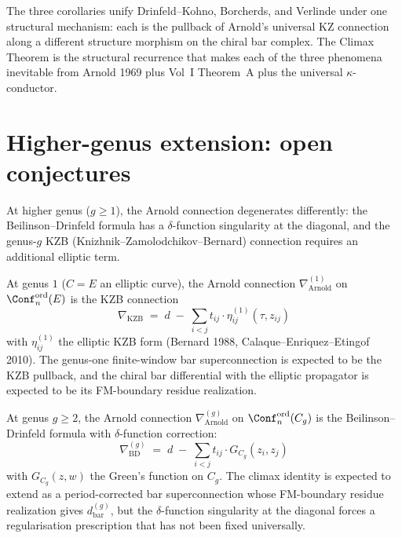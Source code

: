 The three corollaries unify Drinfeld--Kohno, Borcherds, and Verlinde
under one structural mechanism: each is the pullback of Arnold's universal
KZ connection along a different structure morphism on the chiral bar
complex. The Climax Theorem is the structural recurrence that makes
each of the three phenomena inevitable from Arnold 1969 plus Vol~I
Theorem~A plus the universal $\kappa$-conductor.

\section{Higher-genus extension: open conjectures}
\label{sec:climax-higher-genus}

At higher genus ($g \geq 1$), the Arnold connection degenerates differently:
the Beilinson--Drinfeld formula has a $\delta$-function singularity at
the diagonal, and the genus-$g$ KZB \textup{(}Knizhnik--Zamolodchikov--Bernard\textup{)}
connection requires an additional elliptic term.

\begin{conjecture}
\label{conj:climax-kzb-genus-one}
\ClaimStatusConjectured
At genus $1$ \textup{(}$C = E$ an elliptic curve\textup{),} the Arnold
connection $\nabla_{\mathrm{Arnold}}^{(1)}$ on $\Conf_n^{\mathrm{ord}}(E)$
is the KZB connection
\[
 \nabla_{\mathrm{KZB}} \;=\; d \;-\; \sum_{i < j} t_{ij} \cdot \eta_{ij}^{(1)}(\tau, z_{ij})
\]
with $\eta_{ij}^{(1)}$ the elliptic KZB form (Bernard 1988, Calaque--Enriquez--Etingof
2010). The genus-one finite-window bar superconnection is expected to
be the KZB pullback, and the chiral bar differential with the elliptic
propagator is expected to be its FM-boundary residue realization.
\end{conjecture}

\begin{conjecture}
\label{conj:climax-higher-genus-bd}
\ClaimStatusConjectured
At genus $g \geq 2$, the Arnold connection
$\nabla_{\mathrm{Arnold}}^{(g)}$ on $\Conf_n^{\mathrm{ord}}(C_g)$ is
the Beilinson--Drinfeld formula with $\delta$-function correction:
\[
 \nabla_{\mathrm{BD}}^{(g)} \;=\; d \;-\; \sum_{i < j} t_{ij} \cdot G_{C_g}(z_i, z_j)
\]
with $G_{C_g}(z, w)$ the Green's function on $C_g$. The climax identity
is expected to extend as a period-corrected bar superconnection whose
FM-boundary residue realization gives \(d_{\mathrm{bar}}^{(g)}\), but
the $\delta$-function singularity at the diagonal forces a
regularisation prescription that has not been fixed universally.
\end{conjecture}

